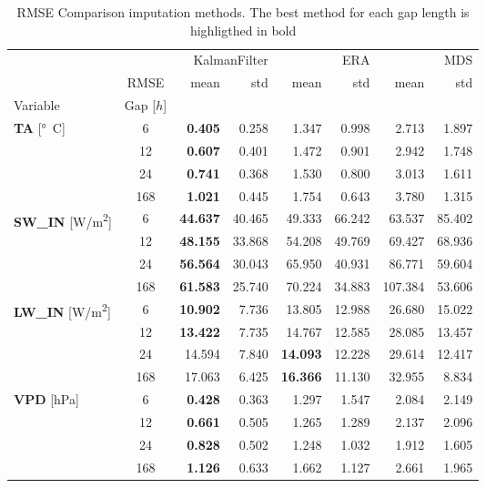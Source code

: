 \begin{table}
\centering
\caption{RMSE Comparison imputation methods. The best method for each gap length is highligthed in bold}
\label{the_table}
\begin{tabular}{p{2.1cm}c|rr|rr|rr}
\toprule
 &  & \multicolumn{2}{r}{KalmanFilter} & \multicolumn{2}{r}{ERA} & \multicolumn{2}{r}{MDS} \\
 & RMSE & mean & std & mean & std & mean & std \\
Variable & Gap [$h$] &  &  &  &  &  &  \\
\midrule
\multirow[c]{4}{*}{\parbox{2.1cm}{\textbf{TA} [\si{°C}]}} & 6 & \bfseries 0.405 & 0.258 & 1.347 & 0.998 & 2.713 & 1.897 \\
 & 12 & \bfseries 0.607 & 0.401 & 1.472 & 0.901 & 2.942 & 1.748 \\
 & 24 & \bfseries 0.741 & 0.368 & 1.530 & 0.800 & 3.013 & 1.611 \\
 & 168 & \bfseries 1.021 & 0.445 & 1.754 & 0.643 & 3.780 & 1.315 \\
\cline{1-8}
\multirow[c]{4}{*}{\parbox{2.1cm}{\textbf{SW\_IN} [\si{W/m^2}]}} & 6 & \bfseries 44.637 & 40.465 & 49.333 & 66.242 & 63.537 & 85.402 \\
 & 12 & \bfseries 48.155 & 33.868 & 54.208 & 49.769 & 69.427 & 68.936 \\
 & 24 & \bfseries 56.564 & 30.043 & 65.950 & 40.931 & 86.771 & 59.604 \\
 & 168 & \bfseries 61.583 & 25.740 & 70.224 & 34.883 & 107.384 & 53.606 \\
\cline{1-8}
\multirow[c]{4}{*}{\parbox{2.1cm}{\textbf{LW\_IN} [\si{W/m^2}]}} & 6 & \bfseries 10.902 & 7.736 & 13.805 & 12.988 & 26.680 & 15.022 \\
 & 12 & \bfseries 13.422 & 7.735 & 14.767 & 12.585 & 28.085 & 13.457 \\
 & 24 & 14.594 & 7.840 & \bfseries 14.093 & 12.228 & 29.614 & 12.417 \\
 & 168 & 17.063 & 6.425 & \bfseries 16.366 & 11.130 & 32.955 & 8.834 \\
\cline{1-8}
\multirow[c]{4}{*}{\parbox{2.1cm}{\textbf{VPD} [\si{hPa}]}} & 6 & \bfseries 0.428 & 0.363 & 1.297 & 1.547 & 2.084 & 2.149 \\
 & 12 & \bfseries 0.661 & 0.505 & 1.265 & 1.289 & 2.137 & 2.096 \\
 & 24 & \bfseries 0.828 & 0.502 & 1.248 & 1.032 & 1.912 & 1.605 \\
 & 168 & \bfseries 1.126 & 0.633 & 1.662 & 1.127 & 2.661 & 1.965 \\

\end{tabular}
\end{table}
